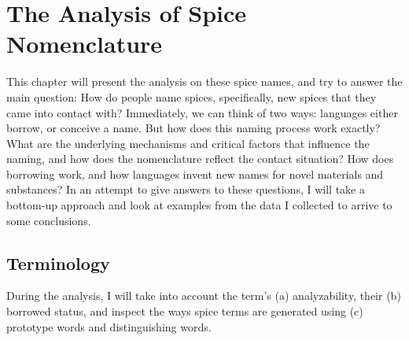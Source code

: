 


\section{The Analysis of Spice Nomenclature}

This chapter will present the analysis on these spice names, and try to answer the main question: How do people name spices, specifically, new spices that they came into contact with? Immediately, we can think of two ways: languages either borrow, or conceive a name. But how does this naming process work exactly? What are the underlying mechanisms and critical factors that influence the naming, and how does the nomenclature reflect the contact situation? How does borrowing work, and how languages invent new names for novel materials and substances? In an attempt to give answers to these questions, I will take a bottom-up approach and look at examples from the data I collected to arrive to some conclusions.

\subsection{Terminology}
During the analysis, I will take into account the term's (a) analyzability, their (b) borrowed status, and inspect the ways spice terms are generated using (c) prototype words and distinguishing words.

